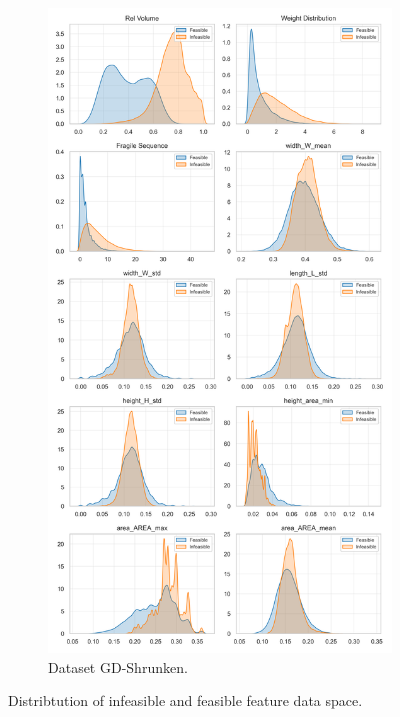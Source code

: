 \begin{figure}[!ht]
\begin{subfigure}[t]{0.49\textwidth}
		\centering
		\caption{Dataset GD-Shrunken.}
		\includegraphics[width=\textwidth]{pictures/dataset_structure/Distribution_CPStatus_RouteDataset.png}
	\end{subfigure}
	\caption{Distribtution of infeasible and feasible feature data space.}
	\label{fig:distribution_cp_label}
\end{figure}



